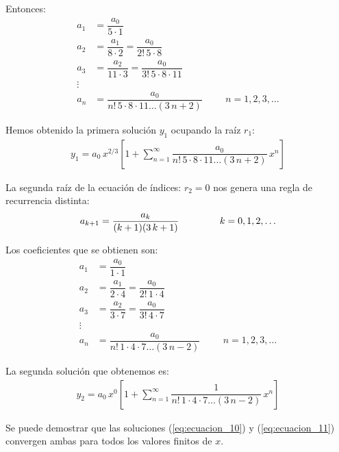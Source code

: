 Entonces:
\begin{align*}
a_{1} &= \dfrac{a_{0}}{5 \cdot 1} \\[0.5em]
a_{2} &= \dfrac{a_{1}}{8 \cdot 2} = \dfrac{a_{0}}{2! \, 5 \cdot 8} \\[0.5em]
a_{3} &= \dfrac{a_{2}}{11 \cdot 3} = \dfrac{a_{0}}{3! \, 5 \cdot 8 \cdot 11} \\
\vdots \\[0.5em]
a_{n} &= \dfrac{a_{0}}{n! \, 5 \cdot 8 \cdot 11 \ldots (3\, n + 2)} \hspace{1cm} n = 1, 2, 3, \ldots
\end{align*}

Hemos obtenido la primera solución $y_{1}$ ocupando la raíz $r_{1}$:
\begin{align}
y_{1} = a_{0} \, x^{2/3} \left[ 1 + \sum_{n=1}^{\infty} \dfrac{a_{0}}{n! \, 5 \cdot 8 \cdot 11 \ldots (3\, n + 2)} \, x^{n} \right]
\label{eq:ecuacion_10}    
\end{align}

La segunda raíz de la ecuación de índices: $r_{2} = 0$ nos genera una regla de recurrencia distinta:
\begin{align}
a_{k+1} = \dfrac{a_{k}}{(k+1)(3 \, k +1)} \hspace{1.5cm} k = 0, 1, 2, \ldots
\label{eq:ecuacion_09}    
\end{align}

Los coeficientes que se obtienen son:
\begin{align*}
a_{1} &= \dfrac{a_{0}}{1 \cdot 1} \\[0.5em]
a_{2} &= \dfrac{a_{1}}{2 \cdot 4} = \dfrac{a_{0}}{2! \, 1 \cdot 4}  \\[0.5em]
a_{3} &= \dfrac{a_{2}}{3 \cdot 7} = \dfrac{a_{0}}{3! \, 4 \cdot 7}  \\[0.5em]
\vdots \\
a_{n} &= \dfrac{a_{0}}{n! \, 1 \cdot 4 \cdot 7 \ldots (3 \, n - 2)} \hspace{1cm} n = 1, 2, 3, \ldots
\end{align*}

La segunda solución que obtenemos es:
\begin{align}
y_{2} = a_{0} \, x^{0} \left[ 1 + \sum_{n=1}^{\infty} \dfrac{1}{n! \, 1 \cdot 4 \cdot 7 \ldots (3\, n - 2)} \, x^{n} \right]
\label{eq:ecuacion_11}
\end{align}    

Se puede demostrar que las soluciones (\ref{eq:ecuacion_10}) y (\ref{eq:ecuacion_11}) convergen ambas para todos los valores finitos de $x$.

